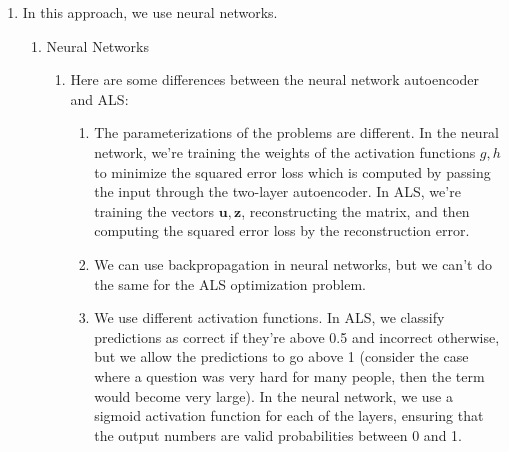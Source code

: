 \documentclass{article}
\newcommand{\mbf}[1]{\mathbf{#1}}
\begin{document}
\begin{enumerate}[label=\arabic*.]
    \item In this approach, we use neural networks. %
        \begin{enumerate}[label=(\roman*)]
            \addtocounter{enumii}{1}
            \item Neural Networks
                \begin{enumerate}[label=(\alph*)]
                    \item Here are some differences between the neural network autoencoder and ALS:
                        \begin{enumerate}
                            \item The parameterizations of the problems are different. In the neural network, we're training the weights of the activation functions $g, h$ to minimize the squared error loss which is computed by passing the input through the two-layer autoencoder. In ALS, we're training the vectors $\mbf u,\mbf z$, reconstructing the matrix, and then computing the squared error loss by the reconstruction error.
                            \item We can use backpropagation in neural networks, but we can't do the same for the ALS optimization problem.
                            \item We use different activation functions. In ALS, we classify predictions as correct if they're above 0.5 and incorrect otherwise, but we allow the predictions to go above 1 (consider the case where a question was very hard for many people, then the term would become very large). In the neural network, we use a sigmoid activation function for each of the layers, ensuring that the output numbers are valid probabilities between 0 and 1.
                        \end{enumerate}

\end{enumerate}
\end{enumerate}
\end{enumerate}
\end{document}
